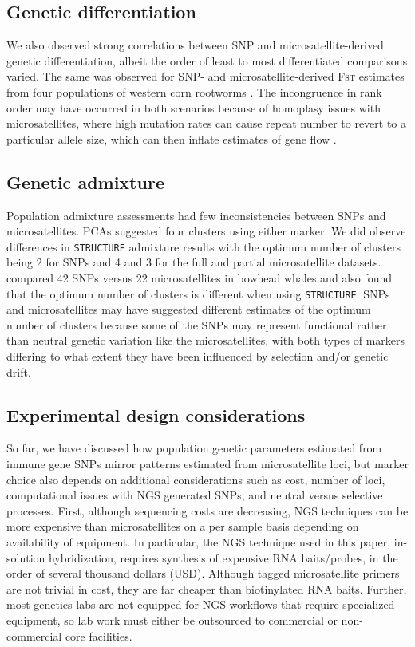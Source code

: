 \documentclass[english]{article}\usepackage[]{graphicx}\usepackage[]{color}
\begin{document}
\subsection*{Genetic differentiation}
We also observed strong correlations between SNP and microsatellite-derived genetic differentiation, albeit the order of least to most differentiated comparisons varied. The same was observed for SNP- and microsatellite-derived \textsc{Fst} estimates from four populations of western corn rootworms \citep{Coates_et_al_2009}. The incongruence in rank order may have occurred in both scenarios because of homoplasy issues with microsatellites, where high mutation rates can cause repeat number to revert to a particular allele size, which can then inflate estimates of gene flow \citep{Coates_et_al_2009}.

\subsection*{Genetic admixture}
Population admixture assessments had few  inconsistencies between SNPs and microsatellites. PCAs suggested four clusters using either marker. We did observe differences in \texttt{STRUCTURE} admixture results with the optimum number of clusters being 2 for SNPs and 4 and 3 for the full and partial microsatellite datasets. \citet{Morin_et_al_2012} compared 42 SNPs versus 22 microsatellites in bowhead whales and also found that the optimum number of clusters is different when using \texttt{STRUCTURE}. SNPs and microsatellites may have suggested different estimates of the optimum number of clusters because some of the SNPs may represent functional rather than neutral genetic variation like the microsatellites, with both types of markers differing to what extent they have been influenced by selection and/or genetic drift.

\subsection*{Experimental design considerations}
So far, we have discussed how population genetic parameters estimated from immune gene SNPs mirror patterns estimated from microsatellite loci, but marker choice also depends on additional considerations such as cost, number of loci, computational issues with NGS generated SNPs, and neutral versus selective processes. First, although sequencing costs are decreasing, NGS techniques can be more expensive than microsatellites on a per sample basis depending on availability of equipment. In particular, the NGS technique used in this paper, in-solution hybridization, requires synthesis of expensive RNA baits/probes, in the order of several thousand dollars (USD). Although tagged microsatellite primers are not trivial in cost, they are far cheaper than biotinylated RNA baits. Further, most genetics labs are not equipped for NGS workflows that require specialized equipment, so lab work must either be outsourced to commercial or non-commercial core facilities.
\end{document}
